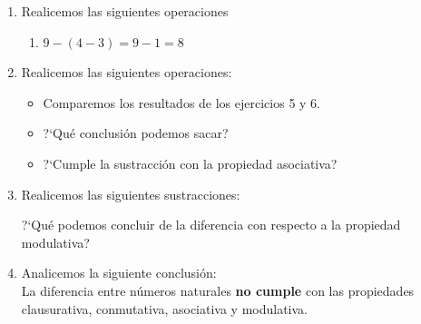 \documentclass[10pt,twoside]{article}
\begin{document}
\begin{enumerate}
\begin{itemize}
\item ?`Es la sustracci\'on una operaci\'on que cumple la propiedad conmutativa?
\end{itemize}
\item Realicemos las siguientes operaciones
\begin{enumerate}
 \item $9-(4-3)=9-1=8$
\end{enumerate}
\item Realicemos las siguientes operaciones:
\begin{enumerate}
\end{enumerate}
\begin{itemize}
 \item Comparemos los resultados de los ejercicios 5 y 6.
\item ?`Qu\'e conclusi\'on podemos sacar?
\item ?`Cumple la sustracci\'on con la propiedad asociativa?
\end{itemize}
\item Realicemos las siguientes sustracciones:
\begin{itemize}\end{itemize}
?`Qu\'e podemos concluir de la diferencia con respecto a la propiedad modulativa?
\item Analicemos la siguiente conclusi\'on:\\
La diferencia entre n\'umeros naturales \textbf{no cumple} con las propiedades clausurativa, conmutativa, asociativa y modulativa.
\end{enumerate}
\end{document}
